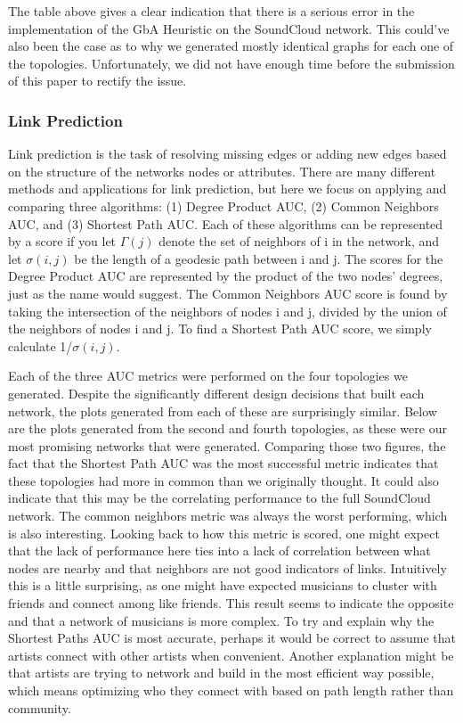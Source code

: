 \documentclass{article}
\begin{document}
The table above gives a clear indication that there is a serious error in the implementation of the GbA Heuristic on the SoundCloud network.  This could've also been the case as to why we generated mostly identical graphs for each one of the topologies.  Unfortunately, we did not have enough time before the submission of this paper to rectify the issue.

\subsubsection{Link Prediction}
Link prediction is the task of resolving missing edges or adding new edges based on the structure of the networks nodes or attributes. There are many different methods and applications for link prediction, but here we focus on applying and comparing three algorithms: (1) Degree Product AUC, (2) Common Neighbors AUC, and (3) Shortest Path AUC. Each of these algorithms can be represented by a score if you let $\Gamma(j)$ denote the set of neighbors of i in the network, and let $\sigma(i, j)$ be the length of a geodesic path between i and j. The scores for the Degree Product AUC are represented by the product of the two nodes' degrees, just as the name would suggest. The Common Neighbors AUC score is found by taking the intersection of the neighbors of nodes i and j, divided by the union of the neighbors of nodes i and j. To find a Shortest Path AUC score, we simply calculate 1/$\sigma(i, j)$. 

Each of the three AUC metrics were performed on the four topologies we generated. Despite the significantly different design decisions that built each network, the plots generated from each of these are surprisingly similar. Below are the plots generated from the second and fourth topologies, as these were our most promising networks that were generated. Comparing those two figures, the fact that the Shortest Path AUC was the most successful metric indicates that these topologies had more in common than we originally thought. It could also indicate that this may be the correlating performance to the full SoundCloud network. The common neighbors metric was always the worst performing, which is also interesting. Looking back to how this metric is scored, one might expect that the lack of performance here ties into a lack of correlation between what nodes are nearby and that neighbors are not good indicators of links. Intuitively this is a little surprising, as one might have expected musicians to cluster with friends and connect among like friends. This result seems to indicate the opposite and that a network of musicians is more complex. To try and explain why the Shortest Paths AUC is most accurate, perhaps it would be correct to assume that artists connect with other artists when convenient. Another explanation might be that artists are trying to network and build in the most efficient way possible, which means optimizing who they connect with based on path length rather than community.  
\end{document}
